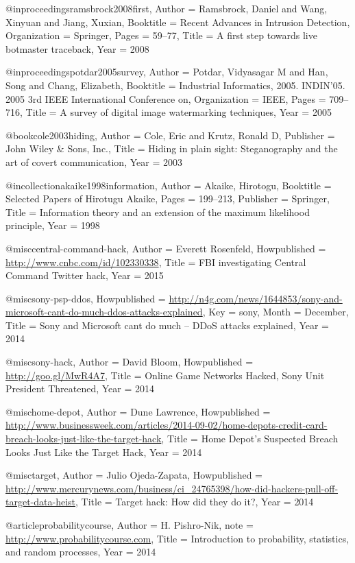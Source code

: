 {{{{{{{{{@inproceedings{ramsbrock2008first,
	Author = {Ramsbrock, Daniel and Wang, Xinyuan and Jiang, Xuxian},
	Booktitle = {Recent Advances in Intrusion Detection},
	Organization = {Springer},
	Pages = {59--77},
	Title = {A first step towards live botmaster traceback},
	Year = {2008}}

@inproceedings{potdar2005survey,
	Author = {Potdar, Vidyasagar M and Han, Song and Chang, Elizabeth},
	Booktitle = {Industrial Informatics, 2005. INDIN'05. 2005 3rd IEEE International Conference on},
	Organization = {IEEE},
	Pages = {709--716},
	Title = {A survey of digital image watermarking techniques},
	Year = {2005}}

@book{cole2003hiding,
	Author = {Cole, Eric and Krutz, Ronald D},
	Publisher = {John Wiley \& Sons, Inc.},
	Title = {Hiding in plain sight: Steganography and the art of covert communication},
	Year = {2003}}

@incollection{akaike1998information,
	Author = {Akaike, Hirotogu},
	Booktitle = {Selected Papers of Hirotugu Akaike},
	Pages = {199--213},
	Publisher = {Springer},
	Title = {Information theory and an extension of the maximum likelihood principle},
	Year = {1998}}

@misc{central-command-hack,
	Author = {Everett Rosenfeld},
	Howpublished = {\url{http://www.cnbc.com/id/102330338}},
	Title = {{FBI investigating Central Command Twitter hack}},
	Year = {2015}}

@misc{sony-psp-ddos,
	Howpublished = {\url{http://n4g.com/news/1644853/sony-and-microsoft-cant-do-much-ddos-attacks-explained}},
	Key = {sony},
	Month = {December},
	Title = {{Sony and Microsoft cant do much -- DDoS attacks explained}},
	Year = {2014}}

@misc{sony-hack,
	Author = {David Bloom},
	Howpublished = {\url{http://goo.gl/MwR4A7}},
	Title = {{Online Game Networks Hacked, Sony Unit President Threatened}},
	Year = {2014}}

@misc{home-depot,
	Author = {Dune Lawrence},
	Howpublished = {\url{http://www.businessweek.com/articles/2014-09-02/home-depots-credit-card-breach-looks-just-like-the-target-hack}},
	Title = {{Home Depot's Suspected Breach Looks Just Like the Target Hack}},
	Year = {2014}}

@misc{target,
	Author = {Julio Ojeda-Zapata},
	Howpublished = {\url{http://www.mercurynews.com/business/ci_24765398/how-did-hackers-pull-off-target-data-heist}},
	Title = {{Target hack: How did they do it?}},
	Year = {2014}}


@article{probabilitycourse,
	Author = {H. Pishro-Nik},
	note = {\url{http://www.probabilitycourse.com}},
	Title = {Introduction to probability, statistics, and random processes},
    Year = {2014}}



}}}}}}}}}
